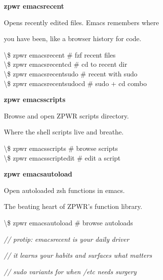 \documentclass[11pt,a4paper,twoside]{book}
\begin{document}
\vspace{12pt}
{\bfseries\color{neonyellow} zpwr emacsrecent}\vspace{4pt}

Opens recently edited files. Emacs remembers where

you have been, like a browser history for code.

\begin{codebox}
\textbackslash{}\$ zpwr emacsrecent            \# fzf recent files\\
\textbackslash{}\$ zpwr emacsrecentcd          \# cd to recent dir\\
\textbackslash{}\$ zpwr emacsrecentsudo        \# recent with sudo\\
\textbackslash{}\$ zpwr emacsrecentsudocd      \# sudo + cd combo\\
\end{codebox}


\vspace{12pt}
{\bfseries\color{neonyellow} zpwr emacsscripts}\vspace{4pt}

Browse and open ZPWR scripts directory.

Where the shell scripts live and breathe.

\begin{codebox}
\textbackslash{}\$ zpwr emacsscripts           \# browse scripts\\
\textbackslash{}\$ zpwr emacsscriptedit        \# edit a script\\
\end{codebox}


\vspace{12pt}
{\bfseries\color{neonyellow} zpwr emacsautoload}\vspace{4pt}

Open autoloaded zsh functions in emacs.

The beating heart of ZPWR's function library.

\begin{codebox}
\textbackslash{}\$ zpwr emacsautoload          \# browse autoloads\\
\end{codebox}

{\small\itshape\color{dimtext} // protip: emacsrecent is your daily driver}

{\small\itshape\color{dimtext} // it learns your habits and surfaces what matters}

{\small\itshape\color{dimtext} // sudo variants for when /etc needs surgery}
\end{document}
